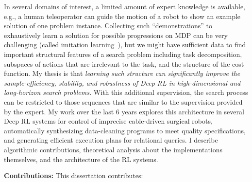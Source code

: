 In several domains of interest, a limited amount of expert knowledge is available, e.g., a human teleoperator can guide the motion of a robot to show an example solution of one problem instance.
Collecting such ``demonstrations'' to exhaustively learn a solution for possible progressions on MDP can be very challenging (called imitation learning~\cite{osa2018algorithmic}), but we might have sufficient data to find important structural features of a search problem including task decomposition, subspaces of actions that are irrelevant to the task, and the structure of the cost function.
My thesis is that \emph{learning such structure can significantly improve the sample-efficiency, stability, and robustness of Deep RL in high-dimensional and long-horizon search problems.} 
With this additional supervision, the search process can be restricted to those sequences that are similar to the supervision provided by the expert.
My work over the last 6 years explores this architecture in several Deep RL systems for control of imprecise cable-driven surgical robots, automatically synthesizing data-cleaning programs to meet quality specifications, and generating efficient execution plans for relational queries. I describe algorithmic contributions, theoretical analysis about the implementations themselves, and the architecture of the RL systems.

\vspace{0.75em} \noindent \textbf{Contributions: }  This dissertation contributes:

